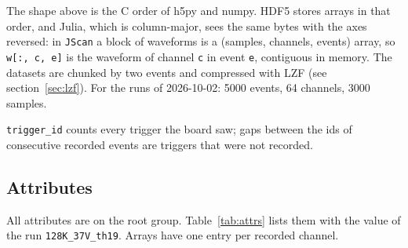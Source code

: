 \documentclass[11pt]{article}
\newcommand{\code}[1]{\texttt{#1}}
\begin{document}
The shape above is the C order of h5py and numpy. HDF5 stores arrays in that
order, and Julia, which is column-major, sees the same bytes with the axes
reversed: in \code{JScan} a block of waveforms is a
(samples, channels, events) array, so \code{w[:, c, e]} is the waveform of
channel \code{c} in event \code{e}, contiguous in memory. The datasets are
chunked by two events and compressed with LZF (see section~\ref{sec:lzf}). For
the runs of 2026-10-02: 5000 events, 64 channels, 3000 samples.

\code{trigger\_id} counts every trigger the board saw; gaps between the ids of
consecutive recorded events are triggers that were not recorded.

\subsection{Attributes}

All attributes are on the root group. Table~\ref{tab:attrs} lists them with
the value of the run \code{128K\_37V\_th19}. Arrays have one entry per
recorded channel.
\end{document}
